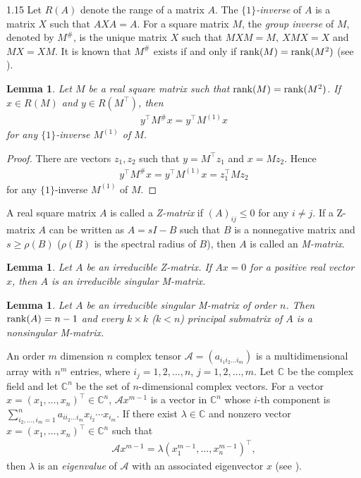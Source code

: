 \documentclass[preprint,12pt]{elsarticle}
\newtheorem{lem}[thm]{Lemma}
\begin{document}
\begin{spacing}{1.15}
Let $R(A)$ denote the range of a matrix $A$. The \textit{$\{1\}$-inverse} of $A$ is a matrix $X$ such that $AXA=A$. For a square matrix $M$, the \textit{group inverse} of $M$, denoted by $M^\#$, is the unique matrix $X$ such that $MXM=M,~XMX=X$ and $MX=XM$. It is known that $M^\#$ exists if and only if $\mbox{\rm rank}(M)=\mbox{\rm rank}(M^2)$ (see \cite{ben2003generalized}).
\begin{lem}\label{lem2.1}
Let $M$ be a real square matrix such that $\mbox{\rm rank}(M)=\mbox{\rm rank}(M^2)$. If $x\in R(M)$ and $y\in R(M^\top)$, then
\begin{eqnarray*}
y^\top M^\#x=y^\top M^{(1)}x
\end{eqnarray*}
for any $\{1\}$-inverse $M^{(1)}$ of $M$.
\end{lem}
\begin{proof}
There are vectors $z_1,z_2$ such that $y=M^\top z_1$ and $x=Mz_2$. Hence
\begin{eqnarray*}
y^\top M^\#x=y^\top M^{(1)}x=z_1^\top Mz_2
\end{eqnarray*}
for any $\{1\}$-inverse $M^{(1)}$ of $M$.
\end{proof}
A real square matrix $A$ is called a \textit{Z-matrix} if $(A)_{ij}\leq0$ for any $i\neq j$. If a Z-matrix $A$ can be written as $A=sI-B$ such that $B$ is a nonnegative matrix and $s\geq\rho(B)$ ($\rho(B)$ is the spectral radius of $B$), then $A$ is called an \textit{M-matrix}.
\begin{lem}\label{lem2.2} \cite{berman1994nonnegative}
Let $A$ be an irreducible Z-matrix. If $Ax=0$ for a positive real vector $x$, then $A$ is an irreducible singular M-matrix.
\end{lem}

\begin{lem}\label{lem2.3} \cite{berman1994nonnegative}
Let $A$ be an irreducible singular M-matrix of order $n$. Then ${\rm rank}(A)=n-1$ and every $k\times k$ ($k<n$) principal submatrix of $A$ is a nonsingular M-matrix.
\end{lem}

An order $m$ dimension $n$ complex tensor $\mathcal{A}=(a_{i_{1}i_{2}...i_{m}})$ is a multidimensional array with $n^{m}$ entries, where $i_{j}=1,2,...,n$, $j=1,2,...,m$. Let $\mathbb{C}$ be the complex field and let $\mathbb{C}^{n}$ be the set of $n$-dimensional complex vectors. For a vector $x=(x_{1},\ldots,x_{n})^\top\in\mathbb{C}^{n}$, $\mathcal{A}x^{m-1}$ is a vector in $\mathbb{C}^{n}$ whose $i$-th component is $\sum_{i_{2},\ldots,i_{m}=1}^{n}a_{ii_{2}...i_{m}}x_{i_{2}}\cdots x_{i_{m}}$. If there exist $\lambda\in\mathbb{C}$ and nonzero vector $x=(x_{1},\ldots,x_{n})^\top\in\mathbb{C}^{n}$ such that
\begin{eqnarray*}
\mathcal{A}x^{m-1}=\lambda(x_1^{m-1},...,x_n^{m-1})^\top,
\end{eqnarray*}
then $\lambda$ is an \textit{eigenvalue} of $\mathcal{A}$ with an associated eigenvector $x$ (see \cite{qi2005eigenvalues,lim2005singular}).


\end{spacing}
\end{document}
